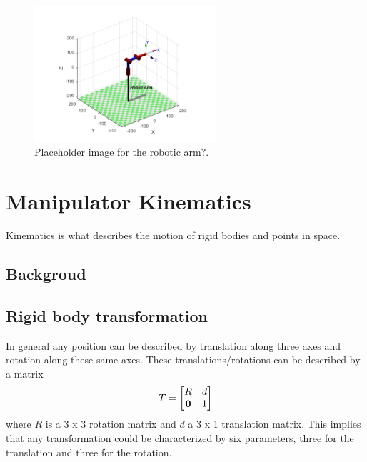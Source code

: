 


\begin{figure}[H]
    \centering
    \includegraphics[width=0.6\textwidth]{chapters/img/robot_arm.png}
    \caption{Placeholder image for the robotic arm?.}
    \label{fig:robotic_manipulator_general}
\end{figure}


\section*{Manipulator Kinematics} %
Kinematics is what describes the motion of rigid bodies and points in space. 

\subsection*{Backgroud}
\subsection*{Rigid body transformation}
In general any position can be described by translation along three axes and rotation along these same axes. These translations/rotations can be described by a matrix
\begin{equation}
    T = 
    \begin{bmatrix}
        R & d \\
        \bf{0} & 1
    \end{bmatrix}
\end{equation}
where \(R\) is a 3 x 3 rotation matrix and \(d\) a 3 x 1 translation matrix. This implies that any transformation could be characterized by six parameters, three for the translation and three for the rotation. \cite{spong}



